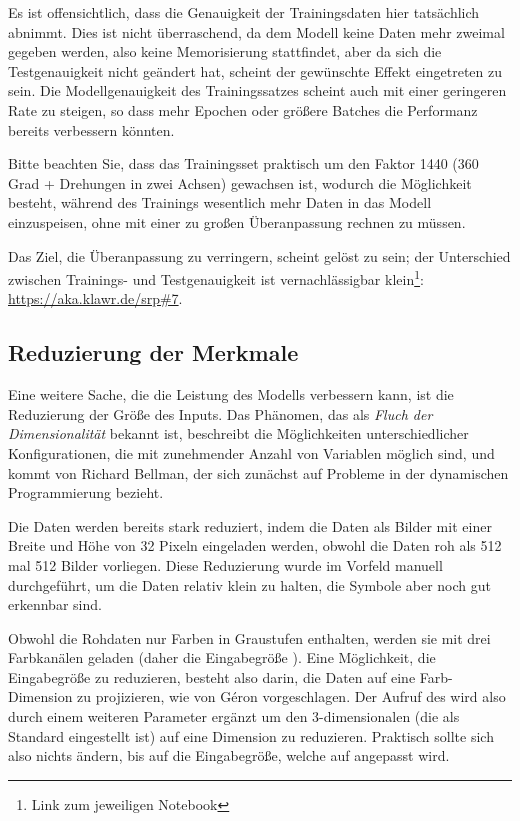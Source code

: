 Es ist offensichtlich, dass die Genauigkeit der Trainingsdaten hier tatsächlich abnimmt.
Dies ist nicht überraschend, da dem Modell keine Daten mehr zweimal gegeben werden, also keine Memorisierung stattfindet, aber da sich die Testgenauigkeit nicht geändert hat, scheint der gewünschte Effekt eingetreten zu sein.
Die Modellgenauigkeit des Trainingssatzes scheint auch mit einer geringeren Rate zu steigen, so dass mehr Epochen oder größere Batches die Performanz bereits verbessern könnten.

Bitte beachten Sie, dass das Trainingsset praktisch um den Faktor 1440 (360 Grad + Drehungen in zwei Achsen) gewachsen ist, wodurch die Möglichkeit besteht, während des Trainings wesentlich mehr Daten in das Modell einzuspeisen, ohne mit einer zu großen Überanpassung rechnen zu müssen.

Das Ziel, die Überanpassung zu verringern, scheint gelöst zu sein; der Unterschied zwischen Trainings- und Testgenauigkeit ist vernachlässigbar klein{\footnote{Link zum jeweiligen Notebook}: \url{https://aka.klawr.de/srp\#7}}.

\subsection{Reduzierung der Merkmale}

Eine weitere Sache, die die Leistung des Modells verbessern kann, ist die Reduzierung der Größe des Inputs.
Das Phänomen, das als \textit{Fluch der Dimensionalität} bekannt ist, beschreibt die Möglichkeiten unterschiedlicher Konfigurationen, die mit zunehmender Anzahl von Variablen möglich sind, und kommt von Richard Bellman, der sich zunächst auf Probleme in der dynamischen Programmierung \cite[p.ix]{Bellman1957} bezieht.

Die Daten werden bereits stark reduziert, indem die Daten als Bilder mit einer Breite und Höhe von 32 Pixeln eingeladen werden, obwohl die Daten roh als 512 mal 512 Bilder vorliegen. Diese Reduzierung wurde im Vorfeld manuell durchgeführt, um die Daten relativ klein zu halten, die Symbole aber noch gut erkennbar sind.

Obwohl die Rohdaten nur Farben in Graustufen enthalten, werden sie mit drei Farbkanälen geladen (daher die Eingabegröße \code{[32, 32, 3]}).
Eine Möglichkeit, die Eingabegröße zu reduzieren, besteht also darin, die Daten auf eine Farb-Dimension zu projizieren, wie von Géron \cite[S.215]{Geron2019} vorgeschlagen.
Der Aufruf des  wird also durch einem weiteren Parameter  ergänzt um den 3-dimensionalen  (die als Standard eingestellt ist) auf eine Dimension zu reduzieren.
Praktisch sollte sich also nichts ändern, bis auf die Eingabegröße, welche auf \code{[32, 32, 1]} angepasst wird.

